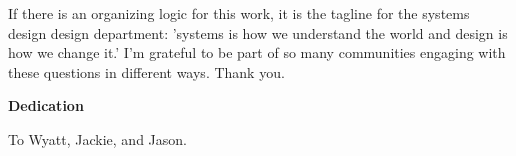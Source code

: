If there is an organizing logic for this work, it is the tagline for the systems design design department: 'systems is how we understand the world and design is how we change it.' I'm grateful to be part of so many communities engaging with these questions in different ways. Thank you.

\cleardoublepage
{}    %

\begin{center}\textbf{Dedication}\end{center}

\begin{center}
To Wyatt, Jackie, and Jason.    
\end{center}

\cleardoublepage
{}    %

\renewcommand\contentsname{Table of Contents}
\tableofcontents
\cleardoublepage
{}    %

{\renewcommand{\addvspace}[1]{} \listoffigures}
\cleardoublepage
{}		%

{\renewcommand{\addvspace}[1]{} \listoftables}
\cleardoublepage
{}		%

\renewcommand*{\abbreviationsname}{List of Abbreviations}
\printglossary[type=abbreviations]
\cleardoublepage
{}		%

\printglossary[type=symbols]
\cleardoublepage
{}		%



